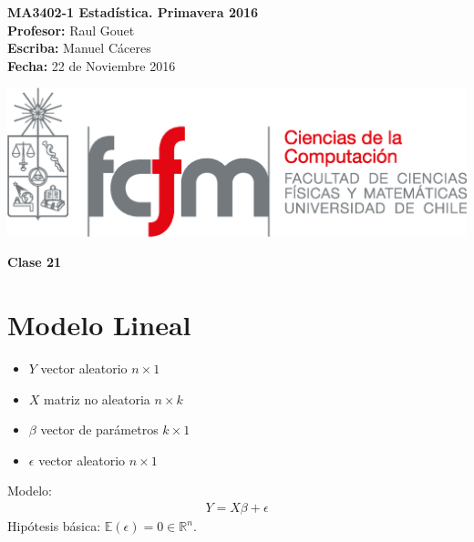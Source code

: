 \documentclass[10pt]{article}
\theoremstyle{plain}
\theoremstyle{definition}
\newcommand{\catnum}{21} %
\newcommand{\fecha}{22 de Noviembre 2016 }
\begin{document}
\vspace*{-1.2 cm}
\begin{minipage}{0.6\textwidth}
\begin{flushleft}
\hspace*{-0.5cm}\textbf{MA3402-1 Estadística. Primavera 2016}\\
\hspace*{-0.5cm}\textbf{Profesor:} Raul Gouet\\
\hspace*{-0.5cm}\textbf{Escriba:} Manuel Cáceres\\
\hspace*{-0.5cm}\textbf{Fecha:} \fecha
\end{flushleft}
\end{minipage}
\begin{minipage}{0.36\textwidth}
\begin{flushright}
\includegraphics[scale=0.3]{imagenes/fcfm_dcc}
\end{flushright}
\end{minipage}
\bigskip

\begin{center}
\LARGE\textbf{Clase \catnum}
\end{center}
\section{Modelo Lineal}
\begin{itemize}
\item $Y$ vector aleatorio $n\times 1$
\item $X$ matriz no aleatoria $n\times k$
\item $\beta$ vector de parámetros $k\times 1$
\item $\epsilon$ vector aleatorio $n\times 1$
\end{itemize}

Modelo:
\begin{align*}
Y = X\beta + \epsilon
\end{align*}
Hipótesis básica: $\mathbb{E}(\epsilon) = 0 \in \mathbb{R}^n$.\\
\end{document}
